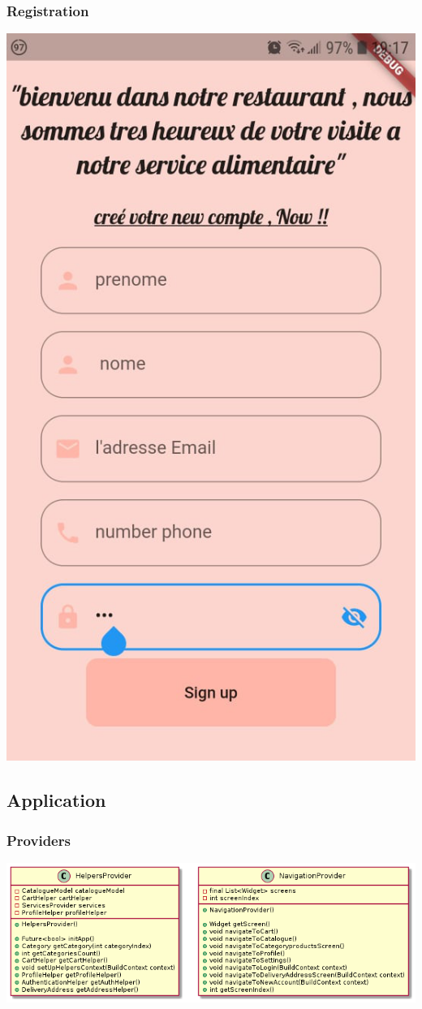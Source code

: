 \documentclass{article}
\begin{document}
\subsubsection{Registration}
\includegraphics[scale=0.3]{./out/MobileApp/Ui/8.png}

\subsection{Application}
\subsubsection{Providers}
\includegraphics[scale=0.5]{./out/MobileApp/Application/Providers/Providers.png}
\end{document}
